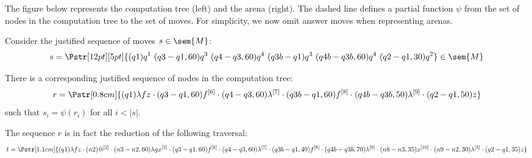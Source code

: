The figure below represents the computation tree (left) and the
arena (right). The dashed line defines a partial function $\psi$
from the set of nodes in the computation tree to the set of moves.
For simplicity, we now omit answer moves when representing arenas.
\begin{center}
\end{center}

Consider the justified sequence of moves $s \in \sem{M}$:
 $$s = \Pstr[12pt][5pt]{(q1){q}^1\ (q3-q1,60){q}^3\ (q4-q3,60){q}^4\ (q3b-q1){q}^3\ (q4b-q3b,60){q}^4\ (q2-q1,30){q}^2 }
\in \sem{M}$$

There is a corresponding justified sequence of nodes in the computation tree:
$$r = \Pstr[0.8cm]{
        (q1){\lambda f z} \cdot
        (q3-q1,60){f}^{[6]} \cdot
        (q4-q3,60){\lambda^{[7]}} \cdot
        (q3b-q1,60){f}^{[8]} \cdot
        (q4b-q3b,50){\lambda^{[9]}} \cdot
        (q2-q1,50){z} }$$
such that $s_i = \psi(r_i)$ for all $i < |s|$.

The sequence $r$ is in fact the reduction of the following
traversal:
$$t = \Pstr[1.1cm]{ (q1){\lambda f z} \cdot
            (n2){@^{[2]}} \cdot (n3-n2,60){\lambda g x^{[3]}} \cdot
            (q3-q1,60){f}^{[6]} \cdot (q4-q3,60){\lambda^{[7]}} \cdot
            (q3b-q1,40){f}^{[8]} \cdot (q4b-q3b,70){\lambda^{[9]}} \cdot
            (n8-n3,35){x^{[10]}} \cdot
            (n9-n2,30){\lambda^{[5]}} \cdot
            (q2-q1,35){z}}
$$

